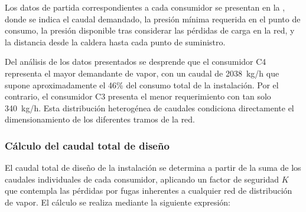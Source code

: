 \documentclass[12pt]{article}
\begin{document}
Los datos de partida correspondientes a cada consumidor se presentan en la , donde se indica el caudal demandado, la presión mínima requerida en el punto de consumo, la presión disponible tras considerar las pérdidas de carga en la red, y la distancia desde la caldera hasta cada punto de suministro.

\begin{table}[H]
	\centering
	\small
	\setlength{\tabcolsep}{3pt}
	\caption{Requerimientos de los puntos de consumo. Fuente: Elaboración grupal.}
	\label{tab:consumidores-requerimientos}
\end{table}

Del análisis de los datos presentados se desprende que el consumidor C4 representa el mayor demandante de vapor, con un caudal de 2038~kg/h que supone aproximadamente el 46\% del consumo total de la instalación. Por el contrario, el consumidor C3 presenta el menor requerimiento con tan solo 340~kg/h. Esta distribución heterogénea de caudales condiciona directamente el dimensionamiento de los diferentes tramos de la red.

\subsubsection{Cálculo del caudal total de diseño}

El caudal total de diseño de la instalación se determina a partir de la suma de los caudales individuales de cada consumidor, aplicando un factor de seguridad $K$ que contempla las pérdidas por fugas inherentes a cualquier red de distribución de vapor. El cálculo se realiza mediante la siguiente expresión:
\end{document}
